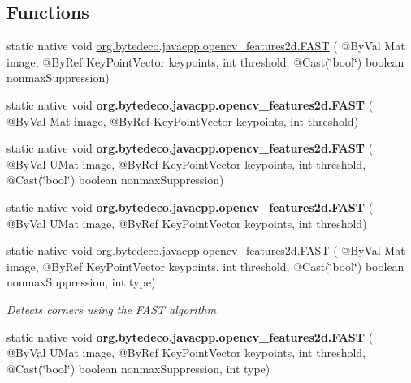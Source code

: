 \subsection*{Functions}
\begin{DoxyCompactItemize}
\item 
static native void \hyperlink{group__features2d__main_gabceff7e5d16ac9f888fa12e3e8a3f39e}{org.\+bytedeco.\+javacpp.\+opencv\+\_\+features2d.\+F\+A\+ST} ( @By\+Val Mat image, @By\+Ref Key\+Point\+Vector keypoints, int threshold, @Cast(\char`\"{}bool\char`\"{}) boolean nonmax\+Suppression)
\item 
\mbox{\label{group__features2d__main_gaf0c4ad9499537ff96b8de123cae0fda3}} 
static native void {\bfseries org.\+bytedeco.\+javacpp.\+opencv\+\_\+features2d.\+F\+A\+ST} ( @By\+Val Mat image, @By\+Ref Key\+Point\+Vector keypoints, int threshold)
\item 
\mbox{\label{group__features2d__main_ga3fc49a28e6f2b9c04a3c2ea69347d380}} 
static native void {\bfseries org.\+bytedeco.\+javacpp.\+opencv\+\_\+features2d.\+F\+A\+ST} ( @By\+Val U\+Mat image, @By\+Ref Key\+Point\+Vector keypoints, int threshold, @Cast(\char`\"{}bool\char`\"{}) boolean nonmax\+Suppression)
\item 
\mbox{\label{group__features2d__main_ga9390c79e9e48ccd04748f933d7376f38}} 
static native void {\bfseries org.\+bytedeco.\+javacpp.\+opencv\+\_\+features2d.\+F\+A\+ST} ( @By\+Val U\+Mat image, @By\+Ref Key\+Point\+Vector keypoints, int threshold)
\item 
static native void \hyperlink{group__features2d__main_ga7b940fc6d27c261d531040a7f8dd22af}{org.\+bytedeco.\+javacpp.\+opencv\+\_\+features2d.\+F\+A\+ST} ( @By\+Val Mat image, @By\+Ref Key\+Point\+Vector keypoints, int threshold, @Cast(\char`\"{}bool\char`\"{}) boolean nonmax\+Suppression, int type)
\begin{DoxyCompactList}\small\item\em Detects corners using the F\+A\+ST algorithm. \end{DoxyCompactList}\item 
\mbox{\label{group__features2d__main_gaeec7bd1fd050f5aab2b5661e14277750}} 
static native void {\bfseries org.\+bytedeco.\+javacpp.\+opencv\+\_\+features2d.\+F\+A\+ST} ( @By\+Val U\+Mat image, @By\+Ref Key\+Point\+Vector keypoints, int threshold, @Cast(\char`\"{}bool\char`\"{}) boolean nonmax\+Suppression, int type)

\end{DoxyCompactItemize}
